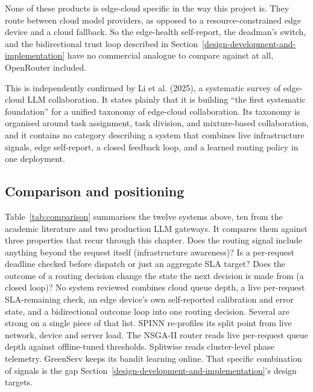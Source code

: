None of these products is edge-cloud specific in the way this project
is. They route between cloud model providers, as opposed to a
resource-constrained edge device and a cloud fallback. So the
edge-health self-report, the deadman's switch, and the bidirectional
trust loop described in Section~\ref{design-development-and-implementation} have no commercial analogue to
compare against at all, OpenRouter included.

This is independently confirmed by Li et al. (2025), a systematic
survey of edge-cloud LLM collaboration. It states plainly that it is building
``the first systematic foundation'' for a unified taxonomy of edge-cloud
collaboration. Its taxonomy is organised around task assignment, task
division, and mixture-based collaboration, and it contains no category
describing a system that combines live infrastructure signals, edge
self-report, a closed feedback loop, and a learned routing policy in one
deployment.

\hypertarget{comparison-and-positioning}{%
\subsection{Comparison and
positioning}\label{comparison-and-positioning}}

Table~\ref{tab:comparison} summarises the twelve systems above, ten
from the academic literature and two production LLM gateways. It
compares them against three properties that recur through this
chapter. Does the routing signal include anything beyond the request
itself (infrastructure awareness)? Is a per-request deadline checked
before dispatch or just an aggregate SLA target? Does the outcome of
a routing decision change the state the next decision is made from (a
closed loop)? No system reviewed combines cloud queue depth, a live
per-request SLA-remaining check, an edge device's own self-reported
calibration and error state, and a bidirectional outcome loop into one
routing decision. Several are strong on a single piece of that list.
SPINN re-profiles its split point from live network, device and server
load. The NSGA-II router reads live per-request queue depth against
offline-tuned thresholds. Splitwise reads cluster-level phase
telemetry. GreenServ keeps its bandit learning online. That specific
combination of signals is the gap Section~\ref{design-development-and-implementation}'s design
targets.

